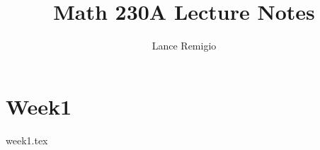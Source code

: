 \documentclass[a4paper]{article}
\title{Math 230A Lecture Notes}
\author{Lance Remigio}
\begin{document}
\maketitle 

\section{Week1}

{week1.tex}
\end{document}
